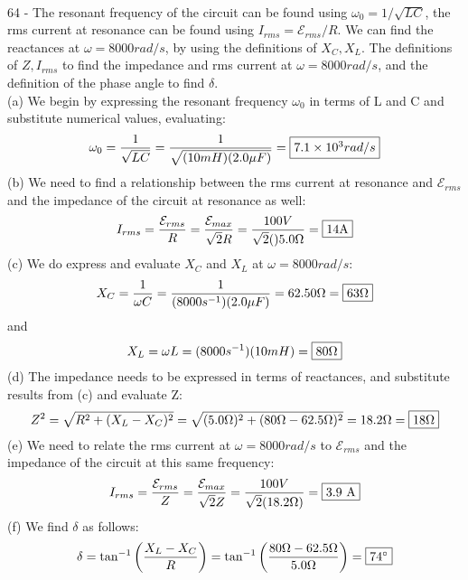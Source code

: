 \documentclass{report}
\begin{document}
\paragraph{}
64 - The resonant frequency of the circuit can be found using $\omega_0 = 1 / \sqrt{LC}$, the rms current at resonance can be found using $I_{rms} = \mathcal{E}_{rms} / R$. We can find the reactances at $\omega = 8000 rad / s$, by using the definitions of $X_C, X_L$. The definitions of  $Z, I_{rms}$ to find the impedance and rms current at $\omega = 8000 rad / s$, and the definition of the phase angle to find $\delta$.\\
(a) We begin by expressing the resonant frequency $\omega_0$ in terms of L and C and substitute numerical values, evaluating:
$$\omega_0 = \frac{1}{\sqrt{LC}} = \frac{1}{\sqrt{(10mH)(2.0 \mu F)}} = \fbox{$7.1 \times 10^3 rad / s$}$$
(b) We need to find a relationship between the rms current at resonance and $\mathcal{E}_{rms}$ and the impedance of the circuit at resonance as well:
$$I_{rms} = \frac{\mathcal{E}_{rms}}{R} = \frac{\mathcal{E}_{max}}{\sqrt{2}R} = \frac{100V}{\sqrt{2}()5.0\Omega} = \fbox{14A}$$
(c) We do express and evaluate $X_C$ and $X_L$ at $\omega = 8000 rad / s$:
$$X_C = \frac{1}{\omega C} = \frac{1}{(8000s^{-1})(2.0 \mu F)} = 62.50 \Omega = \fbox{$63 \Omega$}$$
and
$$X_L = \omega L = (8000 s^{-1})(10 mH) = \fbox{$80\Omega$}$$
(d) The impedance needs to be expressed in terms of reactances, and substitute results from (c) and evaluate Z:
$$Z^2 = \sqrt{R^2 + (X_L - X_C)^2} = \sqrt{(5.0 \Omega)^2 + (80 \Omega - 62.5 \Omega)^2} = 18.2 \Omega = \fbox{$18 \Omega$}$$
(e) We need to relate the rms current at $\omega = 8000 rad / s$ to $\mathcal{E}_{rms}$ and the impedance of the circuit at this same frequency:
$$I_{rms} = \frac{\mathcal{E}_{rms}}{Z} = \frac{\mathcal{E}_{max}}{\sqrt{2}Z} = \frac{100V}{\sqrt{2}(18.2 \Omega)} = \fbox{3.9 A}$$
(f) We find $\delta$ as follows:
$$\delta = \tan^{-1} \left( \frac{X_L - X_C}{R} \right) = \tan^{-1} \left( \frac{80 \Omega - 62.5 \Omega}{5.0 \Omega} \right) = \fbox{$74^{\circ}$}$$
\end{document}

